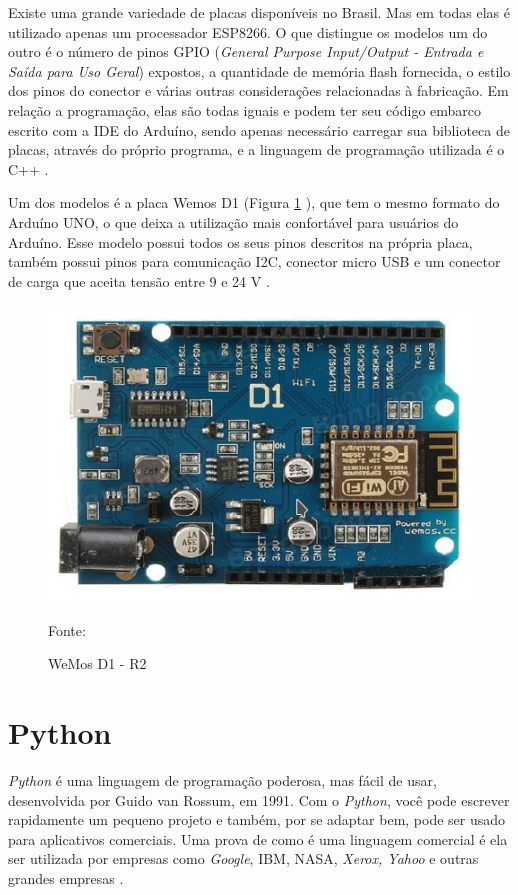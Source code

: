 Existe uma grande variedade de placas disponíveis no Brasil.  Mas em todas elas é utilizado apenas um processador ESP8266. O que distingue os modelos um do outro é o número de pinos GPIO (\textit{General Purpose Input/Output - Entrada e Saída para Uso Geral}) expostos, a quantidade de memória flash fornecida, o estilo dos pinos do conector e várias outras considerações relacionadas à fabricação.  Em relação a  programação, elas são todas iguais e podem ter seu código embarco escrito com a IDE do Arduíno, sendo apenas necessário carregar sua biblioteca de placas, através do próprio programa, e a linguagem de programação utilizada é o C++  \cite{kolban2016}.

Um dos modelos é a placa Wemos D1 (Figura \ref{wemosd1} ), que tem o mesmo formato do Arduíno UNO, o que deixa a utilização mais confortável para usuários do Arduíno. Esse modelo possui todos os seus pinos descritos na própria placa, também possui pinos para comunicação I2C, conector micro USB e um conector de carga que aceita tensão entre 9 e 24 V \cite{kolban2016}\cite{wemos2017}.

\begin{figure}[h]
	\centering
	\includegraphics[keepaspectratio=true,scale=0.7
	]{figuras/wemosd1.png}
	\caption{ WeMos D1 - R2 }
	Fonte: \cite{wemos2017}
	\label{wemosd1}	
\end{figure}

\section{Python}

\textit{Python} é uma linguagem de programação poderosa, mas fácil de usar, desenvolvida por Guido van Rossum, em 1991. Com o \textit{Python}, você pode escrever rapidamente um pequeno projeto e também, por se adaptar bem, pode ser usado para aplicativos comerciais. Uma prova de como é uma linguagem comercial é ela ser utilizada por empresas como \textit{Google}, IBM, NASA, \textit{Xerox, Yahoo} e outras grandes empresas \cite{dawson2010}.

